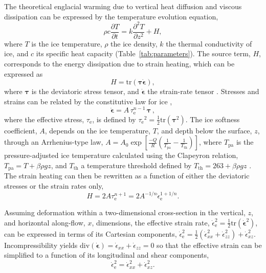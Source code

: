 \documentclass[utf8]{article}
\begin{document}
    The theoretical englacial warming due to vertical heat diffusion and
    viscous dissipation can be expressed by the temperature evolution equation,
    \begin{equation}
      \rho c \frac{\partial T}{\partial t}
        = k \frac{\partial^2 T}{\partial z^2} + H,
    \end{equation}
    where $T$ is the ice temperature, $\rho$ the ice density, $k$ the
    thermal conductivity of ice, and $c$ its specific heat capacity
    (Table~\ref{tab:parameters}). The source term, $H$, corresponds to the
    energy dissipation due to strain heating, which can be expressed as
    \begin{equation}
      H = \mathrm{tr}(\bm{\tau\dot\epsilon}),
    \end{equation}
    where $\bm\tau$ is the deviatoric stress tensor, and $\bm{\dot\epsilon}$ the
    strain-rate tensor \citep[p.~417]{Clarke.etal.1977, Cuffey.Paterson.2010}.
    Stresses and strains can be related by the constitutive law for ice
    \citep{Glen.1952, Nye.1953},
    \begin{equation}
        \bm{\dot\epsilon} = A\,\tau_\mathrm{e}^{n-1}\,\bm{\tau} \,,
    \end{equation}
    where the effective stress, $\tau_\mathrm{e}$, is defined by
        ${\tau_\mathrm{e}}^2 = \frac{1}{2} \mathrm{tr}(\bm\tau^2)$.
    The ice softness coefficient, $A$, depends on the ice temperature, $T$, and
    depth below the surface, $z$, through an Arrhenius-type law,
        ${A = A_0 \exp[
            \frac{-Q}{R}(\frac{1}{T_\mathrm{pa}}-\frac{1}{T_\mathrm{th}})]}$,
    where $T_\mathrm{pa}$ is the pressure-adjusted ice temperature calculated
    using the Clapeyron relation,
        ${T_\mathrm{pa} = T + \beta \rho g z}$,
    and $T_\mathrm{th}$ a temperature threshold defined by
        ${T_\mathrm{th} = 263 + \beta \rho g z}$
    \citep[p.~72]{Cuffey.Paterson.2010}. The strain heating can then be
    rewritten as a function of either the deviatoric stresses or the strain
    rates only,
    \begin{equation}
        H = 2 A \tau_\mathrm{e}^{n+1}
          = 2 A^{-1/n} \dot\epsilon_\mathrm{e}^{1+1/n}.
    \end{equation}

    Assuming deformation within a two-dimensional cross-section in the
    vertical, $z$, and horizontal along-flow, $x$, dimensions, the effective
    strain rate,
        ${\dot\epsilon_\mathrm{e}^2
          = \frac{1}{2}\mathrm{tr}(\bm{\dot\epsilon}^2)}$,
    can be expressed in terms of its Cartesian components,
        ${\dot\epsilon_\mathrm{e}^2
          = \frac{1}{2}(\dot\epsilon_{xx}^2 + \dot\epsilon_{zz}^2)
          + \dot\epsilon_{xz}^2}$.
    Incompressibility yields
        ${\mathrm{div}(\bm{\dot\epsilon})
          = \dot\epsilon_{xx} + \dot\epsilon_{zz}
          = 0}$
    so that the effective strain can be simplified to a function of its
    longitudinal and shear components,
    \begin{equation}
        \dot\epsilon_\mathrm{e}^2 = \dot\epsilon_{xx}^2 + \dot\epsilon_{xz}^2.
    \end{equation}
\end{document}
